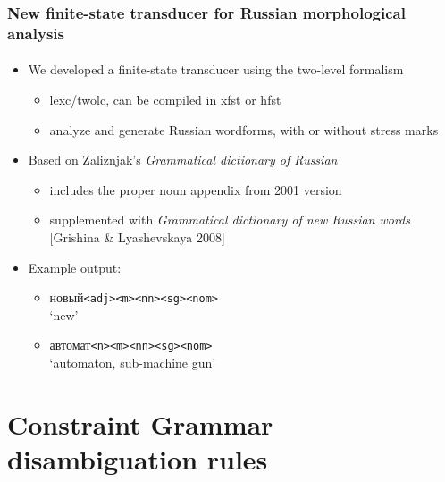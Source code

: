 \documentclass{beamer}
\newcommand{\rus}[1]{\foreignlanguage{russian}{#1}}
\begin{document}
\begin{frame}
\frametitle{New finite-state transducer for Russian morphological analysis}
\framesubtitle{}
\begin{itemize}
	\item We developed a finite-state transducer using the two-level formalism \cite{Koskenniemi-84}
	\begin{itemize}
		\item lexc/twolc, can be compiled in xfst or hfst
		\item analyze and generate Russian wordforms, with or without stress marks
		\pause
	\end{itemize}
	\item Based on Zaliznjak's \emph{Grammatical dictionary of Russian} \cite{Zaliznjak-77}
	\begin{itemize}
		\item includes the proper noun appendix from 2001 version
		\item supplemented with \emph{Grammatical dictionary of new Russian words} [Grishina \& Lyashevskaya 2008]
		\pause
	\end{itemize}
	\item Example output:
	\begin{itemize}
		\item \rus{новый}\texttt{{\small <adj><m><nn><sg><nom>}}\\
	    `new'
		\item \rus{автомат}\texttt{{<nn><sg><nom>}}\\
	    `automaton, sub-machine gun'
	\end{itemize}
\end{itemize}
\end{frame}

\section{Constraint Grammar disambiguation rules} %
\end{document}
